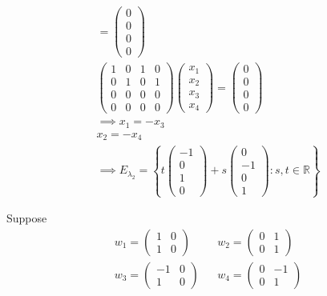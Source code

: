 \begin{enumerate}
\begin{itemize}
\begin{gather}
=
\begin{pmatrix}
0\\0\\0\\0
\end{pmatrix}\\
\begin{pmatrix}
1 & 0 & 1 & 0\\
0 & 1 & 0 & 1\\
0 & 0 & 0 & 0\\
0 & 0 & 0 & 0
\end{pmatrix}
\begin{pmatrix}
x_1\\x_2\\x_3\\x_4
\end{pmatrix}
=
\begin{pmatrix}
0\\0\\0\\0
\end{pmatrix}\\
\implies x_1 = -x_3\\
x_2 = -x_4\\
\implies E_{\lambda_2} = \left\{
t\begin{pmatrix}-1\\0\\1\\0\end{pmatrix} +
s\begin{pmatrix}0\\-1\\0\\1\end{pmatrix}\colon s,t \in \mathbb{R}
\right\}
\end{gather}
\end{itemize}
Suppose
\begin{align}
w_1 = \begin{pmatrix}1&0\\1&0\end{pmatrix} & & w_2 = \begin{pmatrix} 0 & 1
  \\ 0 & 1\end{pmatrix} \\
w_3 = \begin{pmatrix}-1&0\\1&0\end{pmatrix} & & w_4 = \begin{pmatrix}0&-1\\0&1\end{pmatrix}

\end{align}
\end{enumerate}
